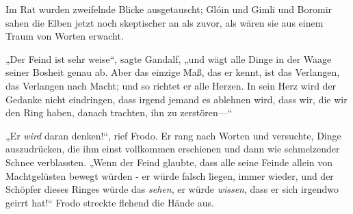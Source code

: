Im Rat wurden zweifelnde Blicke ausgetauscht; Glóin und Gimli und Boromir sahen die Elben jetzt noch skeptischer an als zuvor, als wären sie aus einem Traum von Worten erwacht.

„Der Feind ist sehr weise“, sagte Gandalf, „und wägt alle Dinge in der Waage seiner Bosheit genau ab. Aber das einzige Maß, das er kennt, ist das Verlangen, das Verlangen nach Macht; und so richtet er alle Herzen. In sein Herz wird der Gedanke nicht eindringen, dass irgend jemand es ablehnen wird, dass wir, die wir den Ring haben, danach trachten, ihn zu zerstören—“

„Er \emph{wird} daran denken!“, rief Frodo. Er rang nach Worten und versuchte, Dinge auszudrücken, die ihm einst vollkommen erschienen und dann wie schmelzender Schnee verblassten. „Wenn der Feind glaubte, dass alle seine Feinde allein von Machtgelüsten bewegt würden - er würde falsch liegen, immer wieder, und der Schöpfer dieses Ringes würde das \emph{sehen}, er würde \emph{wissen}, dass er sich irgendwo geirrt hat!“ Frodo streckte flehend die Hände aus.

